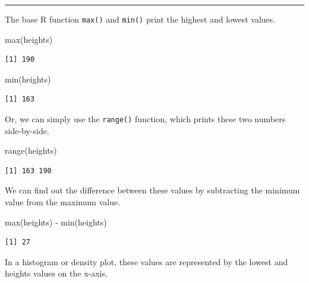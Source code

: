\documentclass[
  letterpaper,
  DIV=11,
  numbers=noendperiod]{scrartcl}
\newenvironment{Shaded}{\begin{snugshade}}{\end{snugshade}}
\newcommand{\FunctionTok}[1]{\textcolor[rgb]{0.28,0.35,0.67}{#1}}
\newcommand{\NormalTok}[1]{\textcolor[rgb]{0.00,0.23,0.31}{#1}}
\newcommand{\SpecialCharTok}[1]{\textcolor[rgb]{0.37,0.37,0.37}{#1}}
\begin{document}
\begin{center}\rule{0.5\linewidth}{0.5pt}\end{center}

The base R function \texttt{max()} and \texttt{min()} print the highest
and lowest values.

\begin{Shaded}
\begin{Highlighting}[]
\FunctionTok{max}\NormalTok{(heights)}
\end{Highlighting}
\end{Shaded}

\begin{verbatim}
[1] 190
\end{verbatim}

\begin{Shaded}
\begin{Highlighting}[]
\FunctionTok{min}\NormalTok{(heights)}
\end{Highlighting}
\end{Shaded}

\begin{verbatim}
[1] 163
\end{verbatim}

Or, we can simply use the \texttt{range()} function, which prints these
two numbers side-by-side.

\begin{Shaded}
\begin{Highlighting}[]
\FunctionTok{range}\NormalTok{(heights)}
\end{Highlighting}
\end{Shaded}

\begin{verbatim}
[1] 163 190
\end{verbatim}

We can find out the difference between these values by subtracting the
minimum value from the maximum value.

\begin{Shaded}
\begin{Highlighting}[]
\FunctionTok{max}\NormalTok{(heights) }\SpecialCharTok{{-}} \FunctionTok{min}\NormalTok{(heights)}
\end{Highlighting}
\end{Shaded}

\begin{verbatim}
[1] 27
\end{verbatim}

In a histogram or density plot, these values are represented by the
lowest and heights values on the x-axis.
\end{document}
